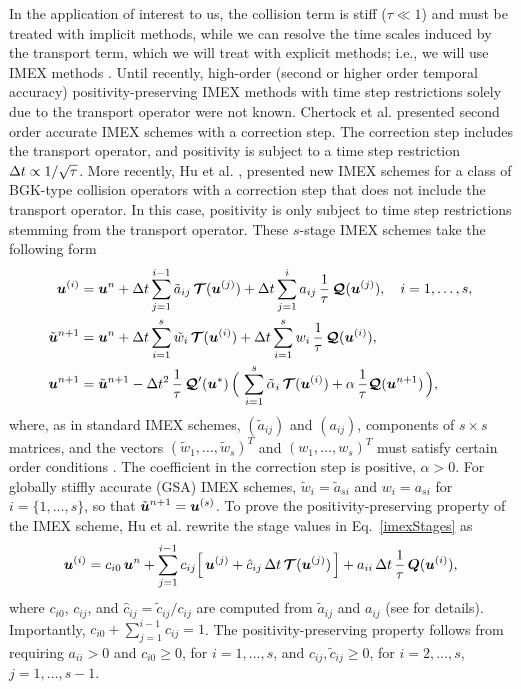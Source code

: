 In the application of interest to us, the collision term is stiff ($\tau\ll1$) and must be treated with implicit methods, while we can resolve the time scales induced by the transport term, which we will treat with explicit methods; i.e., we will use IMEX methods \cite{pareschiRusso_2005}.  
Until recently, high-order (second or higher order temporal accuracy) positivity-preserving IMEX methods with time step restrictions solely due to the transport operator were not known.  
Chertock et al. \cite{chertock_etal_2015} presented second order accurate IMEX schemes with a correction step.  
The correction step includes the transport operator, and positivity is subject to a time step restriction $\Delta t\propto1/\sqrt{\tau}$.  
More recently, Hu et al. \cite{hu_etal_2017}, presented new IMEX schemes for a class of BGK-type collision operators with a correction step that does not include the transport operator.  
In this case, positivity is only subject to time step restrictions stemming from the transport operator.  
These $s$-stage IMEX schemes take the following form \cite{hu_etal_2017}
\begin{align}
  \boldsymbol{u}^{(i)}
  &=\boldsymbol{u}^{n}
  +\Delta t\sum_{j=1}^{i-1}\tilde{a}_{ij}\,\boldsymbol{\mathcal{T}}(\boldsymbol{u}^{(j)})
  +\Delta t\sum_{j=1}^{i}a_{ij}\,\frac{1}{\tau}\,\boldsymbol{\mathcal{Q}}(\boldsymbol{u}^{(j)}),
  \quad i=1,\ldots,s, \label{imexStages} \\
  \tilde{\boldsymbol{u}}^{n+1}
  &=\boldsymbol{u}^{n}
  +\Delta t\sum_{i=1}^{s}\tilde{w}_{i}\,\boldsymbol{\mathcal{T}}(\boldsymbol{u}^{(i)})
  +\Delta t\sum_{i=1}^{s}w_{i}\,\frac{1}{\tau}\,\boldsymbol{\mathcal{Q}}(\boldsymbol{u}^{(i)}), \label{imexIntermediate} \\
  \boldsymbol{u}^{n+1}
  &=\tilde{\boldsymbol{u}}^{n+1}-\Delta t^{2}\,\frac{1}{\tau}\,\boldsymbol{\mathcal{Q}}'(\boldsymbol{u}^{*})\,\Big(\,\sum_{i=1}^{s}\tilde{\alpha}_{i}\,\boldsymbol{\mathcal{T}}(\boldsymbol{u}^{(i)})+\alpha\,\frac{1}{\tau}\boldsymbol{\mathcal{Q}}(\boldsymbol{u}^{n+1})\,\Big), \label{eq:imexCorrection}
\end{align}
where, as in standard IMEX schemes, $(\tilde{a}_{ij})$ and $(a_{ij})$, components of $s\times s$ matrices, and the vectors $(\tilde{w}_{1},\ldots,\tilde{w}_{s})^{T}$ and $(w_{1},\ldots,w_{s})^{T}$ must satisfy certain order conditions \cite{pareschiRusso_2005}.  
The coefficient in the correction step is positive, $\alpha>0$.  
For globally stiffly accurate (GSA) IMEX schemes, $\tilde{w}_{i}=\tilde{a}_{si}$ and $w_{i}=a_{si}$ for $i=\{1,\ldots,s\}$, so that $\tilde{\boldsymbol{u}}^{n+1}=\boldsymbol{u}^{(s)}$.  
To prove the positivity-preserving property of the IMEX scheme, Hu et al. \cite{hu_etal_2017} rewrite the stage values in Eq.~\eqref{imexStages} as
\begin{equation}
  \boldsymbol{u}^{(i)}
  =c_{i0}\,\boldsymbol{u}^{n}+\sum_{j=1}^{i-1}c_{ij}\Big[\,\boldsymbol{u}^{(j)}+\hat{c}_{ij}\,\Delta t\,\boldsymbol{\mathcal{T}}(\boldsymbol{u}^{(j)})\,\Big]
  +a_{ii}\,\Delta t\,\frac{1}{\tau}\,\boldsymbol{Q}(\boldsymbol{u}^{(i)}),
  \label{eq:imexStagesRewrite}
\end{equation}
where $c_{i0}$, $c_{ij}$, and $\hat{c}_{ij}=\tilde{c}_{ij}/c_{ij}$ are computed from $\tilde{a}_{ij}$ and $a_{ij}$ (see \cite{hu_etal_2017} for details).  
Importantly, $c_{i0}+\sum_{j=1}^{i-1}c_{ij}=1$.  
The positivity-preserving property follows from requiring $a_{ii}>0$ and $c_{i0}\ge0$, for $i=1,\ldots,s$, and $c_{ij},\tilde{c}_{ij}\ge0$, for $i=2,\ldots,s$, $j=1,\ldots,s-1$.  
